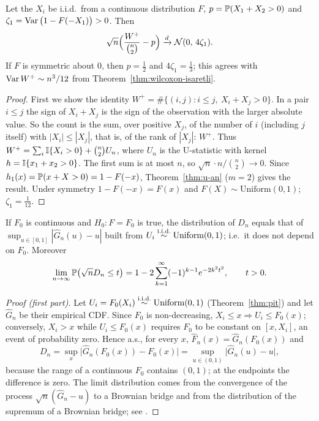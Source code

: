 \documentclass[main.tex]{subfiles}
\begin{document}
\begin{corollary}\label{cor:wilcoxon-an}
Let the $X_i$ be i.i.d.\ from a continuous distribution $F$, $p=\P(X_1+X_2>0)$ and $\zeta_1=\Var\big(1-F(-X_1)\big)>0$. Then
\[
\sqrt n\Big(\frac{W^+}{\binom n2}-p\Big)\dto\Normal(0,\,4\zeta_1).
\]
If $F$ is symmetric about $0$, then $p=\frac12$ and $4\zeta_1=\frac13$; this agrees with $\Var W^+\sim n^3/12$ from Theorem~\ref{thm:wilcoxon-isaretli}.
\end{corollary}
\begin{proof}
First we show the identity $W^+=\#\{(i,j):i\le j,\ X_i+X_j>0\}$. In a pair $i\le j$ the sign of $X_i+X_j$ is the sign of the observation with the larger absolute value. So the count is the sum, over positive $X_j$, of the number of $i$ (including $j$ itself) with $|X_i|\le|X_j|$, that is, of the rank of $|X_j|$: $W^+$. Thus $W^+=\sum_i\I\{X_i>0\}+\binom n2U_n$, where $U_n$ is the U-statistic with kernel $h=\I\{x_1+x_2>0\}$. The first sum is at most $n$, so $\sqrt n\cdot n/\binom n2\to0$. Since $h_1(x)=\P(x+X>0)=1-F(-x)$, Theorem~\ref{thm:u-an} ($m=2$) gives the result. Under symmetry $1-F(-x)=F(x)$ and $F(X)\sim\text{Uniform}(0,1)$; $\zeta_1=\frac1{12}$.
\end{proof}

\begin{theorem}\label{thm:ks}
If $F_0$ is continuous and $H_0:F=F_0$ is true, the distribution of $D_n$ equals that of $\sup_{u\in[0,1]}|\hat G_n(u)-u|$ built from $U_i\iid\text{Uniform}(0,1)$; i.e.\ it does not depend on $F_0$. Moreover \cite{kolmogorov33b}
\[
\lim_{n\to\infty}\P\big(\sqrt nD_n\le t\big)=1-2\sum_{k=1}^\infty(-1)^{k-1}e^{-2k^2t^2},\qquad t>0 .
\]
\end{theorem}
\begin{proof}[Proof (first part)]
Let $U_i=F_0(X_i)\iid\text{Uniform}(0,1)$ (Theorem~\ref{thm:pit}) and let $\hat G_n$ be their empirical CDF. Since $F_0$ is non-decreasing, $X_i\le x\Rightarrow U_i\le F_0(x)$; conversely, $X_i>x$ while $U_i\le F_0(x)$ requires $F_0$ to be constant on $[x,X_i]$, an event of probability zero. Hence a.s., for every $x$, $\hat F_n(x)=\hat G_n(F_0(x))$ and
\[
D_n=\sup_x\big|\hat G_n(F_0(x))-F_0(x)\big|=\sup_{u\in(0,1)}\big|\hat G_n(u)-u\big|,
\]
because the range of a continuous $F_0$ contains $(0,1)$; at the endpoints the difference is zero. The limit distribution comes from the convergence of the process $\sqrt n(\hat G_n-u)$ to a Brownian bridge and from the distribution of the supremum of a Brownian bridge; see \cite[Chapter~19]{vdv}.
\end{proof}
\end{document}
